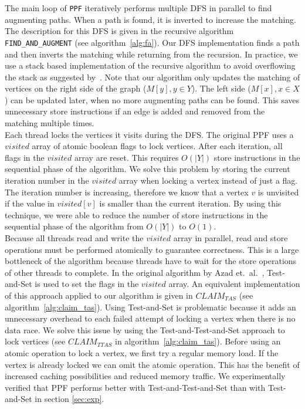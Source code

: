 \documentclass[letterpaper]{article}
\begin{document}
The main loop of \texttt{PPF} iteratively performs multiple DFS in parallel to find augmenting paths. 
When a path is found, it is inverted to increase the matching.
The description for this DFS is given in the recursive algorithm \texttt{FIND\_AND\_AUGMENT} (see algorithm~\ref{alg:fa}). 
Our DFS implementation finds a path and then inverts the matching while returning from the recursion. 
In practice, we use a stack based implementation of the recursive algorithm to avoid overflowing the stack as suggested by~\cite{Azad:2012}. 
Note that our algorithm only updates the matching of vertices on the right side of the graph ($M[y], y \in Y$). 
The left side ($M[x], x \in X$) can be updated later, when no more augmenting paths can be found. 
This saves unnecessary store instructions if an edge is added and removed from the matching multiple times.\\

Each thread locks the vertices it visits during the DFS. The original PPF uses a $visited$ array of atomic boolean flags to lock vertices. 
After each iteration, all flags in the $visited$ array are reset. This requires $O(|Y|)$ store instructions in the sequential phase of the algorithm. 
We solve this problem by storing the current iteration number in the $visited$ array when locking a vertex instead of just a flag. The iteration number is increasing, 
therefore we know that a vertex $v$ is unvisited if the value in $visited[v]$ is smaller than the current iteration. 
By using this technique, we were able to reduce the number of store instructions in the sequential phase of the algorithm from $O(|Y|)$ to $O(1)$.\\

Because all threads read and write the $visited$ array in parallel, read and store operations must be performed atomically to guarantee correctness. 
This is a large bottleneck of the algorithm because threads have to wait for the store operations of other threads to complete. 
In the original algorithm by Azad et.\ al.~\cite{Azad:2012}, Test-and-Set is used to set the flags in the $visited$ array. 
An equivalent implementation of this approach applied to our algorithm is given in \texttt{$CLAIM_{TAS}$} (see algorithm~\ref{alg:claim_tas}). 
Using Test-and-Set is problematic because it adds an unnecessary overhead to each failed attempt of locking a vertex when there is no data race. 
We solve this issue by using the Test-and-Test-and-Set approach to lock vertices (see \texttt{$CLAIM_{TTAS}$} in algorithm~\ref{alg:claim_tas}).
Before using an atomic operation to lock a vertex, we first try a regular memory load. If the vertex is already locked we can omit the atomic operation. 
This has the benefit of increased caching possibilities and reduced memory traffic. 
We experimentally verified that PPF performs better with Test-and-Test-and-Set than with Test-and-Set in section \ref{sec:exp}.
\end{document}
